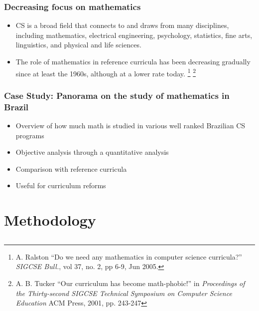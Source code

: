 \documentclass{beamer}
\begin{document}
\begin{frame}
\frametitle{Decreasing focus on mathematics}
\begin{itemize}
	\item CS is a broad field that connects to and draws from many disciplines, 
	including mathematics, electrical engineering, psychology, statistics, fine 
	arts, linguistics, and physical and life sciences.
	\item The role of mathematics in reference curricula has been decreasing
	gradually since at least the 1960s, although at a lower rate today. 
	\footnote{\tiny A. Ralston ``Do we need any mathematics in computer science
	curricula?'' \emph{SIGCSE Bull.}, vol 37, no. 2, pp 6-9, Jun 2005.}
	\footnote{\tiny A. B. Tucker ``Our curriculum has become math-phobic!'' in
	\emph{Proceedings of the Thirty-second SIGCSE Technical Symposium on
	Computer Science Education} ACM Press, 2001, pp. 243-247}

\end{itemize}

\end{frame}

\begin{frame}
\frametitle{Case Study: Panorama on the study of mathematics in Brazil}
\begin{itemize}
	\item Overview of how much math is studied in various well ranked Brazilian
	CS programs
	\item Objective analysis through a quantitative analysis
	\item Comparison with reference curricula
	\item Useful for curriculum reforms
\end{itemize}
\end{frame}


\section{Methodology}
\subsection{}
\end{document}

